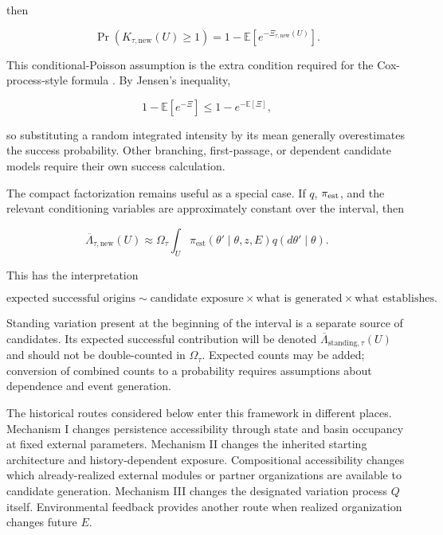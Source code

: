 \documentclass[11pt,a4paper]{article}
\begin{document}
then

\begin{equation}
\Pr(K_{\tau,\mathrm{new}}(U)\ge1)
=
1-\mathbb E\!\left[e^{-\Xi_{\tau,\mathrm{new}}(U)}\right].
\label{eq:success-probability}
\end{equation}

This conditional-Poisson assumption is the extra condition required for the Cox-process-style formula \citep{LastPenrose2017}. By Jensen's inequality,

\begin{equation}
1-\mathbb E[e^{-\Xi}]
\le
1-e^{-\mathbb E[\Xi]},
\label{eq:jensen}
\end{equation}

so substituting a random integrated intensity by its mean generally overestimates the success probability. Other branching, first-passage, or dependent candidate models require their own success calculation.

The compact factorization remains useful as a special case. If $q$, $\pi_{\rm est}$, and the relevant conditioning variables are approximately constant over the interval, then

\begin{equation}
\overline\Lambda_{\tau,\mathrm{new}}(U)
\approx
\Omega_\tau
\int_U
\pi_{\mathrm{est}}(\theta'\mid\theta,z,E)
q(d\theta'\mid\theta).
\label{eq:factorized-count}
\end{equation}

This has the interpretation

\[
\boxed{
\text{expected successful origins}
\sim
\text{candidate exposure}
\times
\text{what is generated}
\times
\text{what establishes}.
}
\]

Standing variation present at the beginning of the interval is a separate source of candidates. Its expected successful contribution will be denoted $\overline\Lambda_{\mathrm{standing},\tau}(U)$ and should not be double-counted in $\Omega_\tau$. Expected counts may be added; conversion of combined counts to a probability requires assumptions about dependence and event generation.

The historical routes considered below enter this framework in different places. Mechanism I changes persistence accessibility through state and basin occupancy at fixed external parameters. Mechanism II changes the inherited starting architecture and history-dependent exposure. Compositional accessibility changes which already-realized external modules or partner organizations are available to candidate generation. Mechanism III changes the designated variation process $Q$ itself. Environmental feedback provides another route when realized organization changes future $E$.
\end{document}
